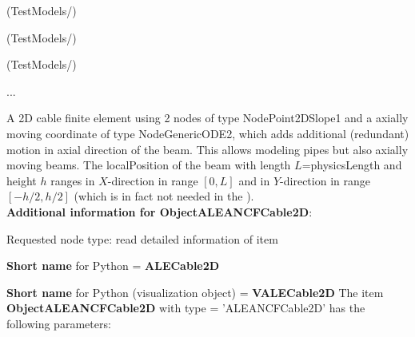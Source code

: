 \item {} (TestModels/)
\item {} (TestModels/)
\item {} (TestModels/)
\item  ...

\ei

%
\newpage

\label{sec:item:ObjectALEANCFCable2D}
A 2D cable finite element using 2 nodes of type NodePoint2DSlope1 and a axially moving coordinate of type NodeGenericODE2, which adds additional (redundant) motion in axial direction of the beam. This allows modeling pipes but also axially moving beams. The localPosition of the beam with length $L$=physicsLength and height $h$ ranges in $X$-direction in range $[0, L]$ and in $Y$-direction in range $[-h/2,h/2]$ (which is in fact not needed in the ).\vspace{12pt}
 \\{\bf Additional information for ObjectALEANCFCable2D}:
\bi
  \item Requested node type: read detailed information of item
  \item {\bf Short name} for Python = {\bf ALECable2D}  \item {\bf Short name} for Python (visualization object) = {\bf VALECable2D}\ei
\vspace{12pt} \noindent The item {\bf ObjectALEANCFCable2D} with type = 'ALEANCFCable2D' has the following parameters:\vspace{-1cm}\\ 
